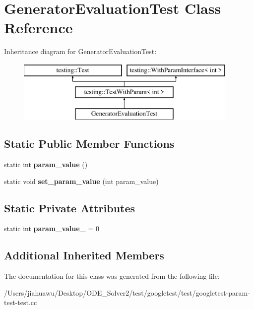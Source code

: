 \hypertarget{class_generator_evaluation_test}{}\section{Generator\+Evaluation\+Test Class Reference}
\label{class_generator_evaluation_test}
Inheritance diagram for Generator\+Evaluation\+Test\+:\begin{figure}[H]
\begin{center}
\leavevmode
\includegraphics[height=3.000000cm]{class_generator_evaluation_test}
\end{center}
\end{figure}
\subsection*{Static Public Member Functions}
\begin{DoxyCompactItemize}
\item 
\mbox{\label{class_generator_evaluation_test_ac819769e32b738677401424deb3c8cbe}} 
static int {\bfseries param\+\_\+value} ()
\item 
\mbox{\label{class_generator_evaluation_test_ae4f5fb96577dd680d9fa1fd6c3c4af46}} 
static void {\bfseries set\+\_\+param\+\_\+value} (int param\+\_\+value)
\end{DoxyCompactItemize}
\subsection*{Static Private Attributes}
\begin{DoxyCompactItemize}
\item 
\mbox{\label{class_generator_evaluation_test_a6bae9750692a4cc4799176eada25ef99}} 
static int {\bfseries param\+\_\+value\+\_\+} = 0
\end{DoxyCompactItemize}
\subsection*{Additional Inherited Members}


The documentation for this class was generated from the following file\+:\begin{DoxyCompactItemize}
\item 
/\+Users/jiahuawu/\+Desktop/\+O\+D\+E\+\_\+\+Solver2/test/googletest/test/googletest-\/param-\/test-\/test.\+cc\end{DoxyCompactItemize}
